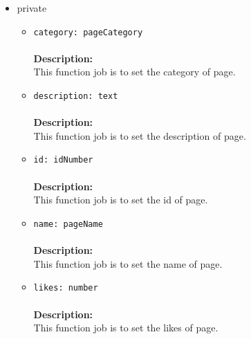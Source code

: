 \begin{itemize}
\begin{itemize}
\begin{itemize}
\item private
\label{sec-1-4-2-8-2-1}%
\begin{itemize}
\item \verb~category: pageCategory~\\\\
\textbf{Description:}\\
      This function job is to set the category of page.\\
\item \verb~description: text~\\\\
\textbf{Description:}\\
      This function job is to set the description of page.\\
\item \verb~id: idNumber~\\\\
\textbf{Description:}\\
      This function job is to set the id of page.\\
\item \verb~name: pageName~\\\\
\textbf{Description:}\\
      This function job is to set the name of page.\\
\item \verb~likes: number~\\\\
\textbf{Description:}\\
      This function job is to set the likes of page.
\end{itemize}



\end{itemize}
\end{itemize}
\end{itemize}
